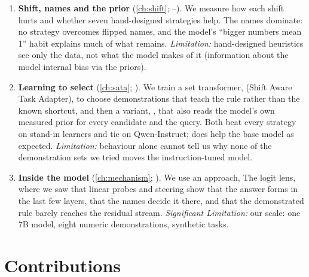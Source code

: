 \begin{enumerate}[leftmargin=2em]
  \item \textbf{Shift, names and the prior} (\autoref{ch:shift}; --).
        We measure how each shift hurts and whether seven hand-designed strategies help.
        The names dominate: no strategy overcomes flipped names, and the model's ``bigger numbers mean 1'' habit explains much of what remains.
        \emph{Limitation:} hand-designed heuristics see only the data, not what the model makes of it (information about the model internal bias via the priors).
  \item \textbf{Learning to select} (\autoref{ch:sata}; ).
        We train a set transformer, \sata (Shift Aware Task Adapter), to choose demonstrations that teach the rule rather than the known shortcut, and then a variant, \satami, that also reads the model's own measured prior for every candidate and the query.
        Both beat every strategy on stand-in learners and tie on Qwen-Instruct; \sata does help the base model as expected.
        \emph{Limitation:} behaviour alone cannot tell us why none of the demonstration sets we tried moves the instruction-tuned model.

  \item \textbf{Inside the model} (\autoref{ch:mechanism}; ).
        We use an approach, The logit lens, where we saw that linear probes and steering show that the answer forms in the last few layers, that the names decide it there, and that the demonstrated rule barely reaches the residual stream.
        \emph{Significant Limitation:} our scale: one 7B model, eight numeric demonstrations, synthetic tasks.
\end{enumerate}

\section{Contributions}

